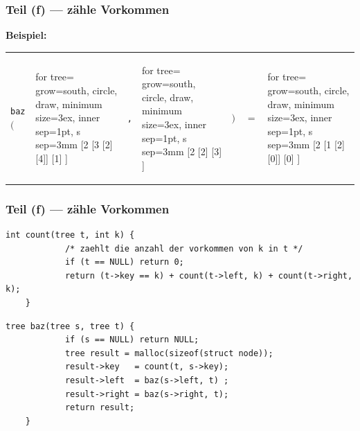 \documentclass{beamer}
\begin{document}
\begin{frame}[fragile] \frametitle{Teil (f) --- zähle Vorkommen}
	
	\textbf{Beispiel:}
	\begin{center}
		\begin{tabularx}{\linewidth}{m{1cm} m{2cm} m{0.2cm} m{1.7cm} m{1cm} m{2cm}}
			\texttt{baz} $\Bigg($
			&
			\begin{forest}
				for tree={ grow=south, circle, draw, minimum size=3ex, inner sep=1pt, s sep=3mm }
				[2 	[3 [2] [4]] [1] ]
			\end{forest}
			&
			\texttt{,}
			&
			\begin{forest}
				for tree={ grow=south, circle, draw, minimum size=3ex, inner sep=1pt, s sep=3mm }
				[2 	[2] [3] ]
			\end{forest}
			&
			$\Bigg) \quad =$			
			&
			\begin{forest}
				for tree={ grow=south, circle, draw, minimum size=3ex, inner sep=1pt, s sep=3mm }
				[2 	[1 [2] [0]] [0] ]
			\end{forest}
		\end{tabularx}
	\end{center}
\end{frame}
\begin{frame}[fragile] \frametitle{Teil (f) --- zähle Vorkommen}
	
	\begin{lstlisting}[style=notebook]
	int count(tree t, int k) { 
			/* zaehlt die anzahl der vorkommen von k in t */
			if (t == NULL) return 0;
			return (t->key == k) + count(t->left, k) + count(t->right, k);
	}
	\end{lstlisting}
	\pause
	\begin{lstlisting}[style=notebook]
	tree baz(tree s, tree t) {
			if (s == NULL) return NULL;
			tree result = malloc(sizeof(struct node));
			result->key   = count(t, s->key);
			result->left  = baz(s->left, t) ;
			result->right = baz(s->right, t);
			return result;
	}
	\end{lstlisting}
\end{frame}







\end{document}
